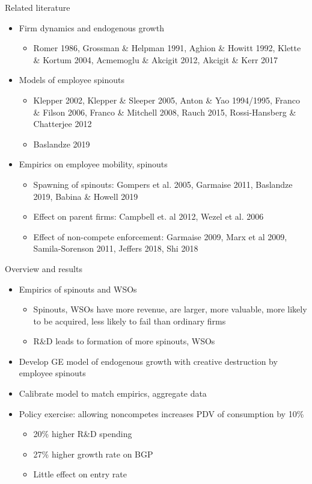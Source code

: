 \documentclass[english,usenames,dvipsnames]{beamer}
\begin{document}
\begin{frame}{Related literature}
\begin{itemize}
\item Firm dynamics and endogenous growth
\begin{itemize}
\item Romer 1986, Grossman \& Helpman 1991, Aghion \& Howitt 1992, Klette \& Kortum 2004, Acmemoglu \& Akcigit 2012, Akcigit \& Kerr 2017
\end{itemize}
\item Models of employee spinouts
\begin{itemize}
\item Klepper 2002, Klepper \& Sleeper 2005, Anton \& Yao 1994/1995, Franco \& Filson 2006, Franco \& Mitchell 2008, Rauch 2015, Rossi-Hansberg \& Chatterjee 2012
\item Baslandze 2019
\end{itemize}
\item Empirics on employee mobility, spinouts
\begin{itemize}
\item Spawning of spinouts: Gompers et al. 2005, Garmaise 2011, Baslandze 2019, Babina \& Howell 2019
\item Effect on parent firms: Campbell et. al 2012, Wezel et al. 2006
\item Effect of non-compete enforcement: Garmaise 2009, Marx et al 2009, Samila-Sorenson 2011, Jeffers 2018, Shi 2018
\end{itemize}
\end{itemize}
\end{frame}

\begin{frame}{Overview and results}
\begin{itemize}
	\item Empirics of spinouts and WSOs
	\begin{itemize}
		\item Spinouts, WSOs have more revenue, are larger, more valuable, more likely to be acquired, less likely to fail than ordinary firms
		\item R\&D leads to formation of more spinouts, WSOs
	\end{itemize}
	\item Develop GE model of endogenous growth with creative destruction by employee spinouts
	\item Calibrate model to match empirics, aggregate data
	\item Policy exercise: allowing noncompetes increases PDV of consumption by 10\%
	\begin{itemize}
		\item 20\% higher R\&D spending 
		\item 27\% higher growth rate on BGP
		\item Little effect on entry rate
	\end{itemize}
\end{itemize}
\end{frame}
\end{document}
